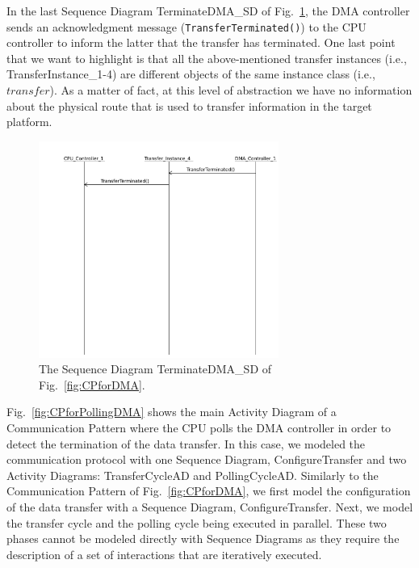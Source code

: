 \documentclass{llncs}
\begin{document}
In the last Sequence Diagram TerminateDMA\_SD of Fig.~\ref{fig:TerminateDMA_SD},
the DMA controller sends an acknowledgment message ({\tt TransferTerminated()}) to the CPU controller to inform the latter that the transfer has
terminated. One last point that we want to highlight is that all the above-mentioned transfer instances (i.e.,
TransferInstance\_1-4) are different objects of the same instance class (i.e., $transfer$). As a matter of fact, at this
level of abstraction we have no information about the physical route that is used to transfer information in the target
platform.\\
%
\begin{figure}[!htbp]
	\centering
	\includegraphics[trim= 0cm 12.5cm 0cm 0cm,
	clip, width=0.7\textwidth]{figures/TerminateDMA_SD.pdf}
	\caption{The Sequence Diagram TerminateDMA\_SD of Fig.~\ref{fig:CPforDMA}.}
	\label{fig:TerminateDMA_SD}
\end{figure}
%

Fig.~\ref{fig:CPforPollingDMA} shows the main Activity Diagram of a Communication Pattern where the CPU polls the DMA
controller in order to detect the termination of the data transfer. In this case, we modeled the communication protocol
with one Sequence Diagram, ConfigureTransfer and two Activity Diagrams: TransferCycleAD and PollingCycleAD. Similarly to
the Communication Pattern of Fig.~\ref{fig:CPforDMA}, we first model the configuration of the data transfer with a
Sequence Diagram, ConfigureTransfer. Next, we model the transfer cycle and the polling cycle being executed in parallel.
These two phases cannot be modeled directly with Sequence Diagrams as they
require the description of a set of interactions that are iteratively executed.
\end{document}
